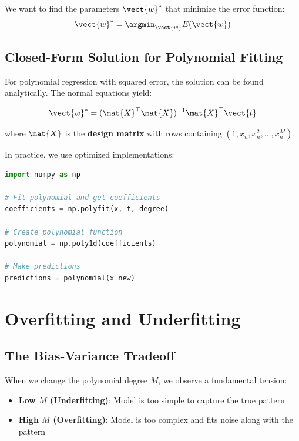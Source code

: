 We want to find the parameters $\vect{w}^*$ that minimize the error function:
\[
\vect{w}^* = \argmin_{\vect{w}} E(\vect{w})
\]

\subsection{Closed-Form Solution for Polynomial Fitting}

For polynomial regression with squared error, the solution can be found analytically. The normal equations yield:

\[
\vect{w}^* = (\mat{X}^\top \mat{X})^{-1} \mat{X}^\top \vect{t}
\]

where $\mat{X}$ is the \textbf{design matrix} with rows containing $(1, x_n, x_n^2, \ldots, x_n^M)$.

\begin{bluebox}
In practice, we use optimized implementations:
\begin{lstlisting}[language=Python]
import numpy as np

# Fit polynomial and get coefficients
coefficients = np.polyfit(x, t, degree)

# Create polynomial function
polynomial = np.poly1d(coefficients)

# Make predictions
predictions = polynomial(x_new)
\end{lstlisting}
\end{bluebox}


\section{Overfitting and Underfitting}

\subsection{The Bias-Variance Tradeoff}

When we change the polynomial degree $M$, we observe a fundamental tension:

\begin{itemize}
    \item \textbf{Low $M$ (Underfitting)}: Model is too simple to capture the true pattern
    \item \textbf{High $M$ (Overfitting)}: Model is too complex and fits noise along with the pattern
\end{itemize}

